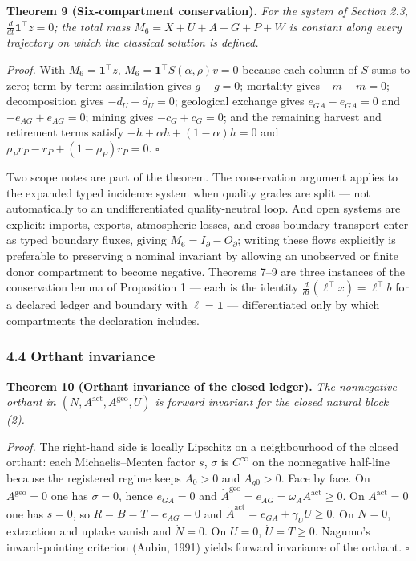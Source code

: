 \documentclass[11pt]{article}
\begin{document}
\textbf{Theorem 9 (Six-compartment conservation).} \emph{For the system
of Section 2.3, \(\frac{d}{dt}\mathbf{1}^\top z = 0\); the total mass
\(M_6 = X + U + A + G + P + W\) is constant along every trajectory on
which the classical solution is defined.}

\emph{Proof.} With \(M_6 = \mathbf{1}^\top z\),
\(\dot M_6 = \mathbf{1}^\top S(\alpha,\rho) v = 0\) because each column
of \(S\) sums to zero; term by term: assimilation gives \(g - g = 0\);
mortality gives \(-m + m = 0\); decomposition gives \(-d_U + d_U = 0\);
geological exchange gives \(e_{GA} - e_{GA} = 0\) and
\(-e_{AG} + e_{AG} = 0\); mining gives \(-c_G + c_G = 0\); and the
remaining harvest and retirement terms satisfy
\(-h + \alpha h + (1-\alpha)h = 0\) and
\(\rho_P r_P - r_P + (1-\rho_P)r_P = 0\). \ensuremath{\square}

Two scope notes are part of the theorem. The conservation argument
applies to the expanded typed incidence system when quality grades are
split --- not automatically to an undifferentiated quality-neutral loop.
And open systems are explicit: imports, exports, atmospheric losses, and
cross-boundary transport enter as typed boundary fluxes, giving
\(\dot M_6 = I_{\partial} - O_{\partial}\); writing these flows
explicitly is preferable to preserving a nominal invariant by allowing
an unobserved or finite donor compartment to become negative. Theorems
7--9 are three instances of the conservation lemma of Proposition 1 ---
each is the identity \(\frac{d}{dt}(\ell^\top x) = \ell^\top b\) for a
declared ledger and boundary with \(\ell = \mathbf{1}\) ---
differentiated only by which compartments the declaration includes.

\subsubsection{4.4 Orthant invariance}\label{orthant-invariance}

\textbf{Theorem 10 (Orthant invariance of the closed ledger).} \emph{The
nonnegative orthant in \((N, A^{\mathrm{act}}, A^{\mathrm{geo}}, U)\) is
forward invariant for the closed natural block (2).}

\emph{Proof.} The right-hand side is locally Lipschitz on a
neighbourhood of the closed orthant: each Michaelis--Menten factor
\(s\), \(\sigma\) is \(C^\infty\) on the nonnegative half-line because
the registered regime keeps \(A_0 > 0\) and \(A_{g0} > 0\). Face by
face. On \(A^{\mathrm{geo}} = 0\) one has \(\sigma = 0\), hence
\(e_{GA} = 0\) and
\(\dot A^{\mathrm{geo}} = e_{AG} = \omega_A A^{\mathrm{act}} \ge 0\). On
\(A^{\mathrm{act}} = 0\) one has \(s = 0\), so
\(R = B = T = e_{AG} = 0\) and
\(\dot A^{\mathrm{act}} = e_{GA} + \gamma_U U \ge 0\). On \(N = 0\),
extraction and uptake vanish and \(\dot N = 0\). On \(U = 0\),
\(\dot U = T \ge 0\). Nagumo's inward-pointing criterion (Aubin, 1991)
yields forward invariance of the orthant. \ensuremath{\square}
\end{document}
